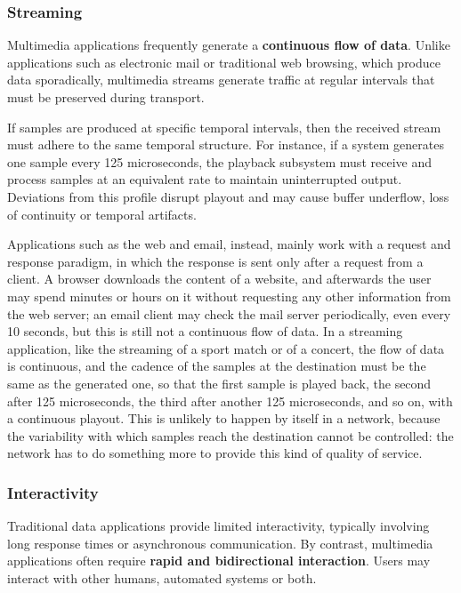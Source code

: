 \documentclass[11pt,a4paper,openany]{report}
\begin{document}
\subsubsection*{Streaming}

Multimedia applications frequently generate a \textbf{continuous flow of data}. Unlike applications such as electronic mail or traditional web browsing, which produce data sporadically, multimedia streams generate traffic at regular intervals that must be preserved during transport.

If samples are produced at specific temporal intervals, then the received stream must adhere to the same temporal structure. For instance, if a system generates one sample every 125 microseconds, the playback subsystem must receive and process samples at an equivalent rate to maintain uninterrupted output. Deviations from this profile disrupt playout and may cause buffer underflow, loss of continuity or temporal artifacts.

Applications such as the web and email, instead, mainly work with a request and response paradigm, in which the response is sent only after a request from a client. A browser downloads the content of a website, and afterwards the user may spend minutes or hours on it without requesting any other information from the web server; an email client may check the mail server periodically, even every 10 seconds, but this is still not a continuous flow of data. In a streaming application, like the streaming of a sport match or of a concert, the flow of data is continuous, and the cadence of the samples at the destination must be the same as the generated one, so that the first sample is played back, the second after 125 microseconds, the third after another 125 microseconds, and so on, with a continuous playout. This is unlikely to happen by itself in a network, because the variability with which samples reach the destination cannot be controlled: the network has to do something more to provide this kind of quality of service.

\subsubsection*{Interactivity}

Traditional data applications provide limited interactivity, typically involving long response times or asynchronous communication. By contrast, multimedia applications often require \textbf{rapid and bidirectional interaction}. Users may interact with other humans, automated systems or both.
\end{document}
